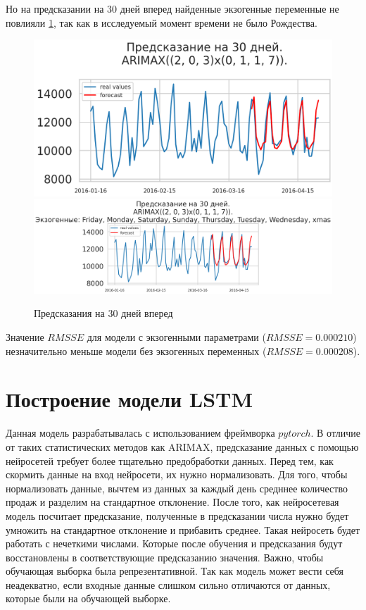 Но на предсказании на 30 дней вперед найденные экзогенные переменные не повлияли \ref{img:arimax_forecast},
так как в исследуемый момент времени не было Рождества.

\def\figurename{Рис}
\begin{figure}[t]
	\centering
	\includegraphics[width=0.9\columnwidth]{./img/arimax_simple_pred30.png}
	\includegraphics[width=0.9\columnwidth]{./img/arimax_with_exog_pred30.png}
	\caption{Предсказания на 30 дней вперед}
	\label{img:arimax_forecast}
\end{figure}

Значение $ RMSSE $ для модели с экзогенными параметрами ($ RMSSE = 0.000210 $) незначительно меньше
модели без экзогенных переменных ($ RMSSE = 0.000208 $).


\section{Построение модели LSTM}

Данная модель разрабатывалась с использованием фреймворка $ pytorch $.
В отличие от таких статистических методов как ARIMAX, предсказание данных
с помощью нейросетей требует более тщательно предобработки данных.
Перед тем, как скормить данные на вход нейросети, их нужно нормализовать.
Для того, чтобы нормализовать данные, вычтем из данных за каждый день средннее
количество продаж и разделим на стандартное отклонение. После того, как
нейросетевая модель посчитает предсказание, полученные в предсказании
числа нужно будет умножить на стандартное отклонение и прибавить среднее.
Такая нейросеть будет работать с нечеткими числами. Которые после обучения
и предсказания будут восстановлены в соответствующие предсказанию значения.
Важно, чтобы обучающая выборка была репрезентативной. Так как модель
может вести себя неадекватно, если входные данные слишком сильно отличаются
от данных, которые были на обучающей выборке.

